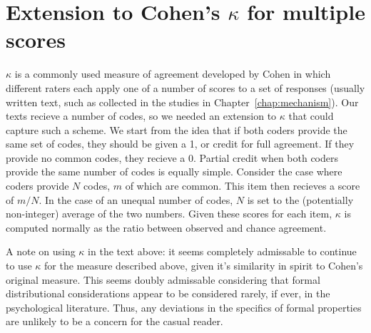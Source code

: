 \graphicspath{{appendices/kappa-extension/}}

\chapter{Extension to Cohen's \texorpdfstring{$\kappa$}{kappa} for multiple scores}
\label{app:kappa}

$\kappa$ is a commonly used measure of agreement developed by Cohen in which
different raters each apply one of a number of scores to a set of responses
(usually written text, such as collected in the studies in
Chapter~\ref{chap:mechanism}).
Our texts recieve a number of codes, so we needed an extension to $\kappa$ that
could capture such a scheme. We start from the idea that if both coders provide
the same set of codes, they should be given a 1, or credit for full agreement.
If they provide no common codes, they recieve a 0. Partial credit when both
coders provide the same number of codes is equally simple. Consider the case
where coders provide $N$ codes, $m$ of which are common. This item then recieves
a score of $m/N$. In the case of an unequal number of codes, $N$ is set to the
(potentially non-integer) average of the two numbers. Given these scores for
each item, $\kappa$ is computed normally as the ratio between observed and
chance agreement. 

A note on using $\kappa$ in the text above: it seems completely admissable to
continue to use $\kappa$ for the measure described above, given it's similarity
in spirit to Cohen's original measure. This seems doubly admissable considering
that formal distributional considerations appear to be considered rarely, if
ever, in the psychological literature. Thus, any deviations in the specifics of
formal properties are unlikely to be a concern for the casual reader.
